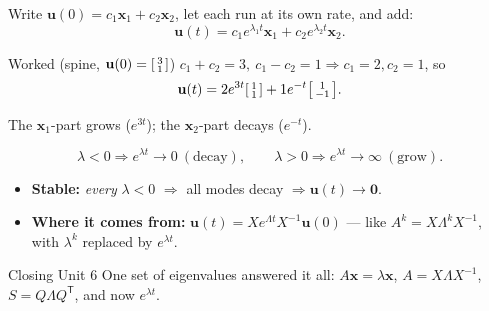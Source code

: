\documentclass[aspectratio=169, 11pt]{beamer}
\newcommand{\uu}{\mathbf{u}}
\newcommand{\xx}{\mathbf{x}}
\newcommand{\zero}{\mathbf{0}}
\newcommand{\T}{\mathsf{T}}
\begin{document}
\begin{frame}[t, plain]
  Write $\uu(0)=c_1\xx_1+c_2\xx_2$, let each run at its own rate, and add:
  \[ \uu(t)=c_1e^{\lambda_1 t}\xx_1+c_2e^{\lambda_2 t}\xx_2. \]
  \begin{block}{Worked (spine, $\uu(0)=\begin{bsmallmatrix}3\\1\end{bsmallmatrix}$)}
    $c_1+c_2=3,\ c_1-c_2=1\Rightarrow c_1=2,c_2=1$, so
    \[ \uu(t)=2e^{3t}\begin{bsmallmatrix}1\\1\end{bsmallmatrix}+1e^{-t}\begin{bsmallmatrix}1\\-1\end{bsmallmatrix}. \]
  \end{block}
  The $\xx_1$-part grows ($e^{3t}$); the $\xx_2$-part decays ($e^{-t}$).
\end{frame}

\begin{frame}[t, plain]
  \[ \lambda<0\Rightarrow e^{\lambda t}\to0\ (\text{decay}),\qquad \lambda>0\Rightarrow e^{\lambda t}\to\infty\ (\text{grow}). \]
  \begin{itemize}
    \setlength{\itemsep}{5pt}
    \item \textbf{Stable:} \emph{every} $\lambda<0$ $\Rightarrow$ all modes decay $\Rightarrow\uu(t)\to\zero$.
    \item \textbf{Where it comes from:} $\uu(t)=Xe^{\Lambda t}X^{-1}\uu(0)$ --- like $A^k=X\Lambda^k X^{-1}$, with $\lambda^k$ replaced by $e^{\lambda t}$.
  \end{itemize}
  \begin{block}{Closing Unit 6}
    One set of eigenvalues answered it all: $A\xx=\lambda\xx$, $A=X\Lambda X^{-1}$, $S=Q\Lambda Q^{\T}$, and now $e^{\lambda t}$.
  \end{block}
\end{frame}
\end{document}
